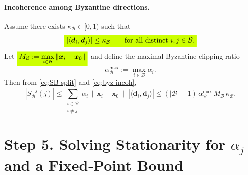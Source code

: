 \documentclass{article}
\theoremstyle{plain}
\theoremstyle{definition}
\theoremstyle{remark}
\begin{document}
\paragraph{Incoherence among Byzantine directions.}
Assume there exists $\kappa_{\mathcal{B}}\in[0,1)$ such that
\begin{equation}
  \colorbox{fluor}{%
    $\displaystyle
        |\langle \bm{d}_i,\bm{d}_j\rangle| \le \kappa_{\mathcal{B}}
            \qquad \text{for all distinct } i,j\in \mathcal{B}.
    $%
  }
\label{eq:byz-incoh}
\end{equation}
Let
$
  \colorbox{fluor}{%
    $\displaystyle
        M_{\mathcal{B}}:=\max_{i\in \mathcal{B}}\|\bm{x}_i-\bm{x}_0\|
    $%
  }
$ and define the maximal Byzantine clipping ratio
\begin{equation}
\alpha^{\max}_{\mathcal{B}} := \max_{i\in \mathcal{B}}\alpha_i.
\label{eq:alphamaxB}
\end{equation}
Then from \eqref{eq:SB-split} and \eqref{eq:byz-incoh},
\begin{equation}
|S_{\mathcal{B}}^{-j}(j)|
\le \sum_{\substack{i\in \mathcal{B}\\ i\ne j}} \alpha_i\,\|\bm{x}_i-\bm{x}_0\|\ |\langle \bm{d}_i,\bm{d}_j\rangle|
\le (|\mathcal{B}|-1)\,\alpha^{\max}_{\mathcal{B}}\, M_{\mathcal{B}}\,\kappa_{\mathcal{B}} .
\label{eq:SBminusj-bound}
\end{equation}

\bigskip

\section*{Step 5. Solving Stationarity for \(\alpha_j\) and a Fixed‑Point Bound}
\end{document}
